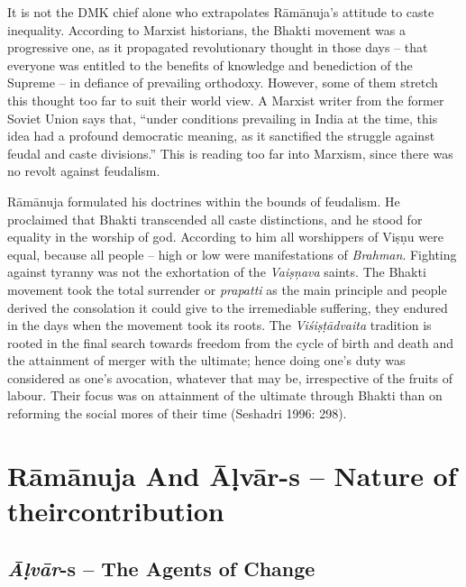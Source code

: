 It is not the DMK chief alone who extrapolates Rāmānuja’s attitude to caste inequality. According to Marxist historians, the Bhakti movement was a progressive one, as it propagated revolutionary thought in those days – that everyone was entitled to the benefits of knowledge and benediction of the Supreme – in defiance of prevailing orthodoxy. However, some of them stretch this thought too far to suit their world view. A Marxist writer from the former Soviet Union says that, “under conditions prevailing in India at the time, this idea had a profound democratic meaning, as it sanctified the struggle against feudal and caste divisions.” This is reading too far into Marxism, since there was no revolt against feudalism.

Rāmānuja formulated his doctrines within the bounds of feudalism. He proclaimed that Bhakti transcended all caste distinctions, and he stood for equality in the worship of god. According to him all worshippers of Viṣṇu were equal, because all people – high or low were manifestations of \textit{Brahman}. Fighting against tyranny was not the exhortation of the \textit{Vaiṣņava} saints. The Bhakti movement took the total surrender or \textit{prapatti} as the main principle and people derived the consolation it could give to the irremediable suffering, they endured in the days when the movement took its roots. The \textit{Viśiṣṭādvaita} tradition is rooted in the final search towards freedom from the cycle of birth and death and the attainment of merger with the ultimate; hence doing one’s duty was considered as one’s avocation, whatever that may be, irrespective of the fruits of labour. Their focus was on attainment of the ultimate through Bhakti than on reforming the social mores of their time (Seshadri 1996: 298).


\section*{Rāmānuja And Āḷvār-s – Nature of their\hfill \break contribution}

\subsection*{\textit{Āḷvār}-s – The Agents of Change}

\vskip -6pt

